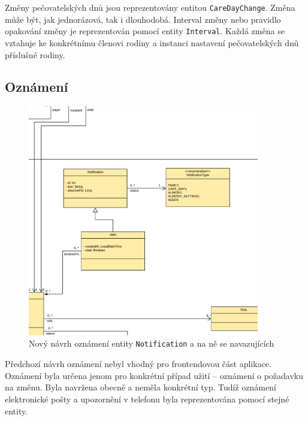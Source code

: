         Změny pečovatelských dnů jsou reprezentovány entitou \verb|CareDayChange|. Změna může být, jak jednorázová, tak i dlouhodobá. Interval změny nebo pravidlo opakování změny je reprezentován pomocí entity \verb|Interval|. Každá změna se vztahuje ke konkrétnímu členovi rodiny a instanci nastavení pečovatelských dnů příslušné rodiny.
        
    \subsection{Oznámení}\label{navrh:upravy:notification}
        \begin{figure}\centering
	       \includegraphics[width=0.9\textwidth]{pdfs/Notification2}
	       \caption[Nový návrh oznámení]{Nový návrh oznámení entity \texttt{Notification} a na ně se navazujících}\label{image:notification2}
        \end{figure}
        Předchozí návrh oznámení nebyl vhodný pro frontendovou část aplikace. Oznámení byla určena jenom pro konkrétní případ užití -- oznámení o požadavku na změnu. Byla navržena obecně a neměla konkrétní typ. Tudíž oznámení elektronické pošty a upozornění v telefonu byla reprezentována pomocí stejné entity.
        
